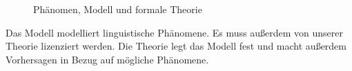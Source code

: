 \begin{figure}[htbp]
\caption{\label{abb-modell}Phänomen, Modell und formale Theorie}
\end{figure}\nocite{Netter98a}%
%
%
%
Das Modell modelliert linguistische Phänomene. Es muss außerdem
von unserer Theorie lizenziert werden.
Die Theorie legt das Modell fest %
und macht außerdem Vorhersagen in Bezug auf mögliche
Phänomene.

